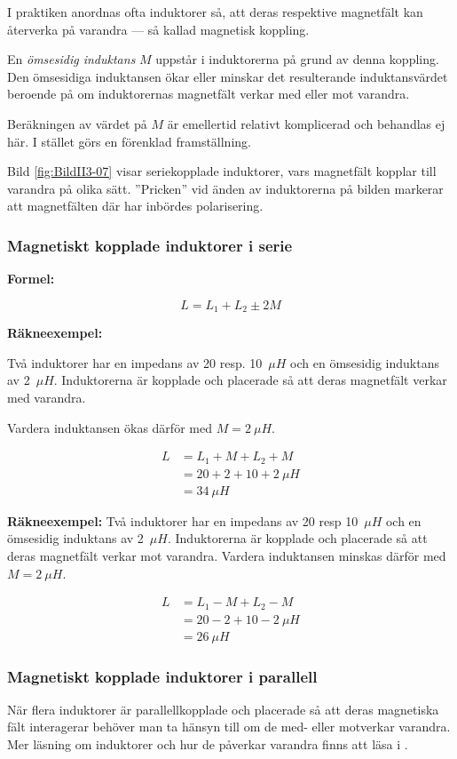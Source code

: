 I praktiken anordnas ofta induktorer så, att deras respektive magnetfält kan
återverka på varandra --- så kallad magnetisk koppling.

En \emph{ömsesidig induktans} \(M\) uppstår i induktorerna på grund av denna
koppling.
Den ömsesidiga induktansen ökar eller minskar det resulterande induktansvärdet
beroende på om induktorernas magnetfält verkar med eller mot varandra.

Beräkningen av värdet på \(M\) är emellertid relativt komplicerad och behandlas
ej här.
I stället görs en förenklad framställning.

Bild \ref{fig:BildII3-07} visar seriekopplade induktorer, vars magnetfält
kopplar till varandra på olika sätt.
''Pricken'' vid änden av induktorerna på bilden markerar att magnetfälten där
har inbördes polarisering.

\subsubsection{Magnetiskt kopplade induktorer i serie}

\textbf{Formel:}

\[L = L_1 +L_2 \pm 2M\]

\textbf{Räkneexempel:}

Två induktorer har en impedans av 20 resp. 10~\(\mu H\) och en ömsesidig
induktans av 2~\(\mu H\).
Induktorerna är kopplade och placerade så att deras magnetfält verkar med
varandra.

Vardera induktansen ökas därför med \(M = 2\ \mu H\).

\begin{align*}
  L &= L_1 + M + L_2 + M \\
  &= 20 + 2 + 10 + 2\ \mu H \\
  &= 34\ \mu H
\end{align*}

\textbf{Räkneexempel:}
Två induktorer har en impedans av 20 resp 10~\(\mu H\) och en ömsesidig
induktans av 2~\(\mu H\).
Induktorerna är kopplade och placerade så att deras magnetfält verkar mot
varandra.
Vardera induktansen minskas därför med \(M = 2\ \mu H\).

\begin{align*}
  L &= L_1 - M + L_2 - M \\
  & = 20 - 2 + 10 - 2\ \mu H \\
  &= 26\ \mu H
\end{align*}

\subsubsection{Magnetiskt kopplade induktorer i parallell}
När flera induktorer är parallellkopplade och placerade så att deras magnetiska
fält interagerar behöver man ta hänsyn till om de med- eller motverkar varandra.
Mer läsning om induktorer och hur de påverkar varandra finns att läsa i
\cite{letrafo}.

